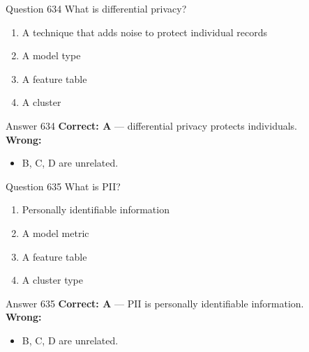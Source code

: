 \documentclass[aspectratio=169,11pt]{beamer}
\begin{document}
	\begin{frame}{Question 634}
		What is differential privacy?
		\begin{enumerate}[label=\Alph*.]
			\item A technique that adds noise to protect individual records
			\item A model type
			\item A feature table
			\item A cluster
		\end{enumerate}
	\end{frame}
	\begin{frame}{Answer 634}
		\textbf{Correct: A} --- differential privacy protects individuals.\\
		\vspace{0.5em}
		\textbf{Wrong:}
		\begin{itemize}
			\item B, C, D are unrelated.
		\end{itemize}
	\end{frame}
	
	\begin{frame}{Question 635}
		What is PII?
		\begin{enumerate}[label=\Alph*.]
			\item Personally identifiable information
			\item A model metric
			\item A feature table
			\item A cluster type
		\end{enumerate}
	\end{frame}
	\begin{frame}{Answer 635}
		\textbf{Correct: A} --- PII is personally identifiable information.\\
		\vspace{0.5em}
		\textbf{Wrong:}
		\begin{itemize}
			\item B, C, D are unrelated.
		\end{itemize}
	\end{frame}
	
\end{document}
